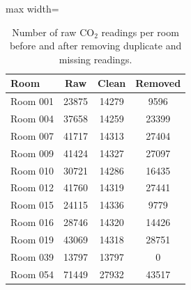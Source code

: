 \begin{table}[ht]
\centering
\begin{adjustbox}{max width=\textwidth}
\begin{tabular}{lccc}
\hline
Room & Raw & Clean & Removed \\
\hline
Room 001 & 23875 & 14279 & 9596 \\
Room 004 & 37658 & 14259 & 23399 \\
Room 007 & 41717 & 14313 & 27404 \\
Room 009 & 41424 & 14327 & 27097 \\
Room 010 & 30721 & 14286 & 16435 \\
Room 012 & 41760 & 14319 & 27441 \\
Room 015 & 24115 & 14336 & 9779 \\
Room 016 & 28746 & 14320 & 14426 \\
Room 019 & 43069 & 14318 & 28751 \\
Room 039 & 13797 & 13797 & 0 \\
Room 054 & 71449 & 27932 & 43517 \\
\hline
\end{tabular}
\end{adjustbox}
\caption{Number of raw CO$_2$ readings per room before and after removing duplicate and missing readings.}
\label{tab:raw_removed_readings}
\end{table}
